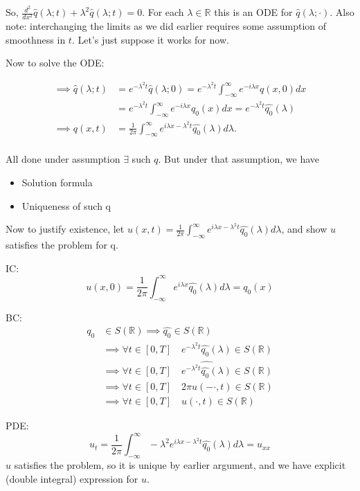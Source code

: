 So, $\frac{d^2}{dx^2}\widehat{q}(\lambda;t) + \lambda^2\widehat{q}(\lambda;t) = 0.$ For each $\lambda \in \mathbb{R}$ this is an ODE for $\widehat{q}(\lambda;\cdot)$. Also note: interchanging the limits as we did earlier requires some assumption of smoothness in $t$. Let's just suppose it works for now.

Now to solve the ODE:

\begin{align*}
\implies \widehat{q}(\lambda;t) &= e^{-\lambda^2t}\widehat{q}(\lambda;0)  = e^{-\lambda^2t}\int_{-\infty}^{\infty}e^{-i\lambda x}q(x,0)dx\\
&=e^{-\lambda^2t}\int_{-\infty}^{\infty}e^{-i\lambda x}q_0(x)dx = e^{-\lambda^2t}\widehat{q_0}(\lambda)\\
\implies q(x,t )&= \frac{1}{2\pi} \int_{-\infty}^{\infty}e^{i\lambda x - \lambda^2t}\widehat{q_0}(\lambda)d\lambda.\\
\end{align*}

All done under assumption $\exists$ such $q$. But under that assumption, we have
\begin{itemize}
	\item Solution formula
	\item Uniqueness of such q
\end{itemize}

Now to justify existence, let $u(x,t) = \frac{1}{2\pi} \int_{-\infty}^{\infty}e^{i\lambda x - \lambda^2t}\widehat{q_0}(\lambda)d\lambda$, and show $u$ satisfies the problem for q.

IC:
$$u(x,0) = \frac{1}{2\pi} \int_{-\infty}^{\infty}e^{i\lambda x}\widehat{q_0}(\lambda)d\lambda = q_0(x)$$

BC:
\begin{align*}
q_0 &\in S(\mathbb{R}) \implies \widehat{q_0} \in  S(\mathbb{R}) \\
&\implies \forall t \in [0,T]\quad e^{-\lambda^2t}\widehat{q_0}(\lambda) \in S(\mathbb{R})\\
&\implies \forall t \in [0,T]\quad \widehat{e^{-\lambda^2t}\widehat{q_0}(\lambda)} \in S(\mathbb{R})\\
&\implies \forall t \in [0,T]\quad 2\pi u(-\cdot,t) \in S(\mathbb{R})\\
&\implies \forall t \in [0,T]\quad u(\cdot,t) \in S(\mathbb{R})
\end{align*}

PDE:
$$ u_t = \frac{1}{2\pi} \int_{-\infty}^{\infty}-\lambda^2e^{i\lambda x-\lambda^2t}\widehat{q_0}(\lambda)d\lambda = u_{xx}$$
$u$ satisfies the problem, so it is unique by earlier argument, and we have explicit (double integral) expression for $u$.

